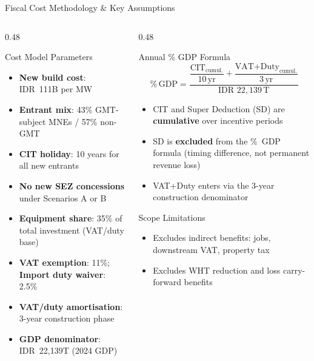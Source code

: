 \documentclass[aspectratio=169,11pt]{beamer}
\begin{document}
\begin{frame}{Fiscal Cost Methodology \& Key Assumptions}

\begin{columns}[T]
\begin{column}{0.48\textwidth}
\begin{block}{Cost Model Parameters}
\small
\begin{itemize}
    \item \textbf{New build cost}: IDR~111B per MW
    \item \textbf{Entrant mix}: 43\% GMT-subject MNEs / 57\% non-GMT
    \item \textbf{CIT holiday}: 10 years for all new entrants
    \item \textbf{No new SEZ concessions} under Scenarios A or B
    \item \textbf{Equipment share}: 35\% of total investment (VAT/duty base)
    \item \textbf{VAT exemption}: 11\%; \textbf{Import duty waiver}: 2.5\%
    \item \textbf{VAT/duty amortisation}: 3-year construction phase
    \item \textbf{GDP denominator}: IDR~22,139T (2024 GDP)
\end{itemize}
\end{block}
\end{column}

\begin{column}{0.48\textwidth}
\begin{block}{Annual \% GDP Formula}
\small
\[
\%\,\text{GDP} = \frac{\dfrac{\text{CIT}_{\text{cumul.}}}{10\,\text{yr}} + \dfrac{\text{VAT+Duty}_{\text{cumul.}}}{3\,\text{yr}}}{\text{IDR }22{,}139\,\text{T}}
\]
\vspace{0.3em}
\begin{itemize}
    \item CIT and Super Deduction (SD) are \textbf{cumulative} over incentive periods
    \item SD is \textbf{excluded} from the \%~GDP formula (timing difference, not permanent revenue loss)
    \item VAT+Duty enters via the 3-year construction denominator
\end{itemize}
\end{block}
\begin{block}{Scope Limitations}
\small
\begin{itemize}
    \item Excludes indirect benefits: jobs, downstream VAT, property tax
    \item Excludes WHT reduction and loss carry-forward benefits
\end{itemize}
\end{block}
\end{column}
\end{columns}

\end{frame}
\end{document}
